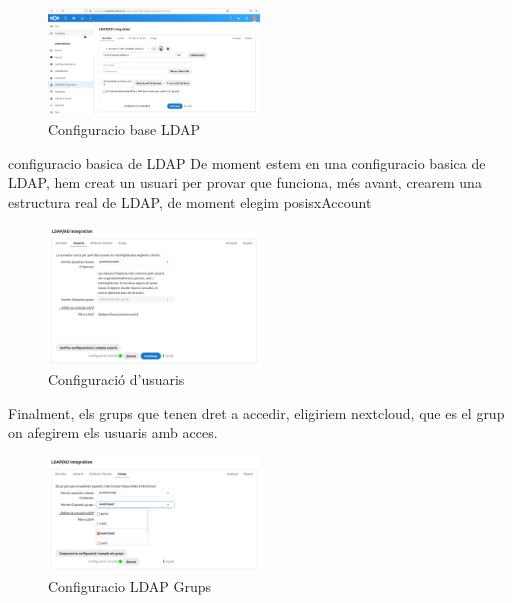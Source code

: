 \documentclass[
  10pt,
]{krantz}
\begin{document}
\begin{figure}
\centering
\includegraphics[width=0.5\textwidth,height=\textheight]{imatges/proxmox/config_LDAP1.png}
\caption{Configuracio base LDAP}
\end{figure}

\begin{rmdcuidao}{configuracio basica de LDAP}
De moment estem en una configuracio basica de LDAP, hem creat un usuari per provar que funciona, més avant, crearem una estructura real de LDAP, de moment elegim posisxAccount

\end{rmdcuidao}

\begin{figure}
\centering
\includegraphics[width=0.5\textwidth,height=\textheight]{imatges/proxmox/config_LDAP2.png}
\caption{Configuració d'usuaris}
\end{figure}

Finalment, els grups que tenen dret a accedir, eligiriem nextcloud, que es el grup on afegirem els usuaris amb acces.

\begin{figure}
\centering
\includegraphics[width=0.5\textwidth,height=\textheight]{imatges/proxmox/config_LDAP_grups.png}
\caption{Configuracio LDAP Grups}
\end{figure}
\end{document}
